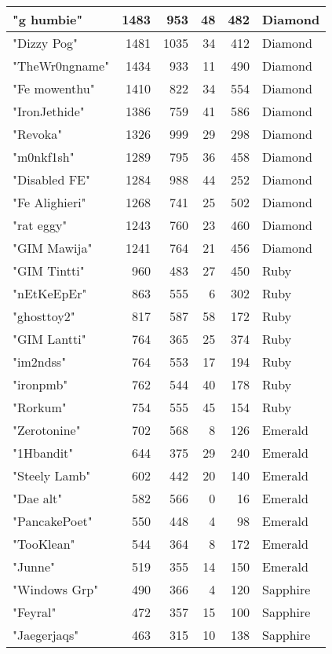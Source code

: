 \documentclass{article}
\begin{document}
\begin{table}[htbp]
\begin{tabular}{|l|r|r|r|r|l|}
"g humbie" & 1483 & 953 & 48 & 482 & Diamond \\ \hline
"Dizzy Pog" & 1481 & 1035 & 34 & 412 & Diamond \\ \hline
"TheWr0ngname" & 1434 & 933 & 11 & 490 & Diamond \\ \hline
"Fe mowenthu" & 1410 & 822 & 34 & 554 & Diamond \\ \hline
"IronJethide" & 1386 & 759 & 41 & 586 & Diamond \\ \hline
"Revoka" & 1326 & 999 & 29 & 298 & Diamond \\ \hline
"m0nkf1sh" & 1289 & 795 & 36 & 458 & Diamond \\ \hline
"Disabled FE" & 1284 & 988 & 44 & 252 & Diamond \\ \hline
"Fe Alighieri" & 1268 & 741 & 25 & 502 & Diamond \\ \hline
"rat eggy" & 1243 & 760 & 23 & 460 & Diamond \\ \hline
"GIM Mawija" & 1241 & 764 & 21 & 456 & Diamond \\ \hline
"GIM Tintti" & 960 & 483 & 27 & 450 & Ruby \\ \hline
"nEtKeEpEr" & 863 & 555 & 6 & 302 & Ruby \\ \hline
"ghosttoy2" & 817 & 587 & 58 & 172 & Ruby \\ \hline
"GIM Lantti" & 764 & 365 & 25 & 374 & Ruby \\ \hline
"im2ndss" & 764 & 553 & 17 & 194 & Ruby \\ \hline
"ironpmb" & 762 & 544 & 40 & 178 & Ruby \\ \hline
"Rorkum" & 754 & 555 & 45 & 154 & Ruby \\ \hline
"Zerotonine" & 702 & 568 & 8 & 126 & Emerald \\ \hline
"1Hbandit" & 644 & 375 & 29 & 240 & Emerald \\ \hline
"Steely Lamb" & 602 & 442 & 20 & 140 & Emerald \\ \hline
"Dae alt" & 582 & 566 & 0 & 16 & Emerald \\ \hline
"PancakePoet" & 550 & 448 & 4 & 98 & Emerald \\ \hline
"TooKlean" & 544 & 364 & 8 & 172 & Emerald \\ \hline
"Junne" & 519 & 355 & 14 & 150 & Emerald \\ \hline
"Windows Grp" & 490 & 366 & 4 & 120 & Sapphire \\ \hline
"Feyral" & 472 & 357 & 15 & 100 & Sapphire \\ \hline
"Jaegerjaqs" & 463 & 315 & 10 & 138 & Sapphire \\ \hline

\end{tabular}
\end{table}
\end{document}
